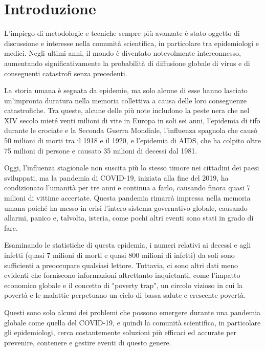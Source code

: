 \section{Introduzione}

L'impiego di metodologie e tecniche sempre più avanzate è stato oggetto 
di discussione e interesse nella comunità scientifica, in particolare tra 
epidemiologi e medici. Negli ultimi anni, il mondo è diventato notevolmente
interconnesso, aumentando significativamente la probabilità di diffusione 
globale di virus e di conseguenti catastrofi senza precedenti.

La storia umana è segnata da epidemie, ma solo alcune di esse hanno 
lasciato un'impronta duratura nella memoria collettiva a causa delle loro 
conseguenze catastrofiche. Tra queste, alcune delle più note includono la 
peste nera che nel XIV secolo mieté venti milioni di vite in Europa in 
soli sei anni, l'epidemia di tifo durante le crociate e la Seconda 
Guerra Mondiale, l'influenza spagnola che causò 50 milioni di morti tra 
il 1918 e il 1920, e l'epidemia di AIDS, che ha colpito oltre 75 milioni 
di persone e causato 35 milioni di decessi dal 1981.

Oggi, l'influenza stagionale non suscita più lo stesso timore nei 
cittadini dei paesi sviluppati, ma la pandemia di COVID-19, iniziata alla 
fine del 2019, ha condizionato l'umanità per tre anni e continua a farlo, 
causando finora quasi 7 milioni di vittime accertate. Questa pandemia 
rimarrà impressa nella memoria umana poiché ha messo in crisi l'intero 
sistema governativo globale, causando allarmi, panico e, talvolta, 
isteria, come pochi altri eventi sono stati in grado di fare.

Esaminando le statistiche di questa epidemia, i numeri relativi ai decessi 
e agli infetti (quasi 7 milioni di morti e quasi 800 milioni di infetti) 
da soli sono sufficienti a preoccupare qualsiasi lettore. Tuttavia, ci 
sono altri dati meno evidenti che forniscono informazioni altrettanto 
inquietanti, come l'impatto economico globale e il concetto di 
"poverty trap", un circolo vizioso in cui la povertà e le malattie 
perpetuano un ciclo di bassa salute e crescente povertà.

Questi sono solo alcuni dei problemi che possono emergere durante una 
pandemia globale come quella del COVID-19, e quindi la comunità 
scientifica, in particolare gli epidemiologi, cerca costantemente 
soluzioni più efficaci ed accurate per prevenire, contenere e gestire 
eventi di questo genere.

